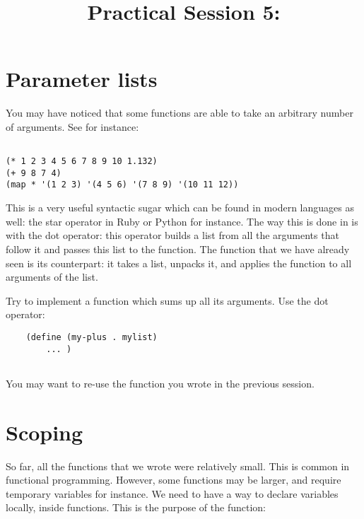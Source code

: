 \documentclass{../../../tp}
\title{Practical Session 5: \scheme}
\author{}
\begin{document}
	
	\maketitle

\section{Parameter lists}

You may have noticed that some \scheme functions are able to take an arbitrary number of arguments. See for instance: 

\begin{verbatim}

(* 1 2 3 4 5 6 7 8 9 10 1.132)
(+ 9 8 7 4)
(map * '(1 2 3) '(4 5 6) '(7 8 9) '(10 11 12))

\end{verbatim}

This is a very useful syntactic sugar which can be found in modern languages as well: the star operator in Ruby or Python for instance. The way this is done in \scheme is with the dot operator: this operator builds a list from all the arguments that follow it and passes this list to the function. The  function that we have already seen is its counterpart: it takes a list, unpacks it, and applies the function to all arguments of the list. 

\begin{instruction}
	Try to implement a  function which sums up all its arguments. Use the dot operator: 
	
	\begin{verbatim}
	(define (my-plus . mylist)
		... )
	
	\end{verbatim}
	
	You may want to re-use the  function you wrote in the previous session.
\end{instruction}


\section{Scoping}

So far, all the functions that we wrote were relatively small. This is common in functional programming. However, some functions may be larger, and require temporary variables for instance. We need to have a way to declare variables locally, inside functions. This is the purpose of the  function:
\end{document}

